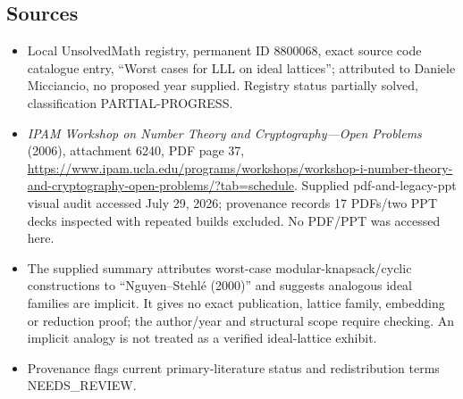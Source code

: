 \documentclass[11pt]{article}
\begin{document}
\subsection{Sources}
\begin{itemize}
\item Local UnsolvedMath registry, permanent ID 8800068, exact source code catalogue entry, ``Worst cases for LLL on ideal lattices''; attributed to Daniele Micciancio, no proposed year supplied. Registry status partially solved, classification PARTIAL-PROGRESS.
\item \emph{IPAM Workshop on Number Theory and Cryptography---Open Problems} (2006), attachment 6240, PDF page 37, \url{https://www.ipam.ucla.edu/programs/workshops/workshop-i-number-theory-and-cryptography-open-problems/?tab=schedule}. Supplied pdf-and-legacy-ppt visual audit accessed July 29, 2026; provenance records 17 PDFs/two PPT decks inspected with repeated builds excluded. No PDF/PPT was accessed here.
\item The supplied summary attributes worst-case modular-knapsack/cyclic constructions to ``Nguyen--Stehl\'e (2000)'' and suggests analogous ideal families are implicit. It gives no exact publication, lattice family, embedding or reduction proof; the author/year and structural scope require checking. An implicit analogy is not treated as a verified ideal-lattice exhibit.
\item Provenance flags current primary-literature status and redistribution terms NEEDS\_REVIEW.
\end{itemize}
\end{document}

